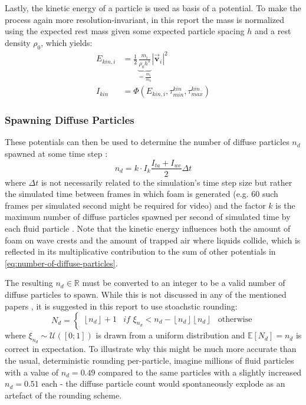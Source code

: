 \documentclass[oneside, a4paper]{book}
\newcommand\abs[1]{\left|#1\right|}
\newcommand\vek[1]{\vec{\bm{#1}}}
\newcommand\br[1]{\left(#1\right)}
\begin{document}
  Lastly, the kinetic energy of a particle is used as basis of a potential. To make the process again more resolution-invariant, in this report the mass is normalized using the expected rest mass given some expected particle spacing $h$ and a rest density $\rho_0$, which yields:
  \begin{align}
    E_{kin,i} &= \frac{1}{2} \underbrace{\frac{m_i}{\rho_0 h^3}}_{=\frac{m_i}{m_0}} \abs{\vek{v}_i}^2\\
    I_{kin} &= \Phi(E_{kin,i},\tau_{min}^{kin}, \tau_{max}^{kin})
  \end{align}

  \subsubsection{Spawning Diffuse Particles}
  These potentials can then be used to determine the number of diffuse particles $n_d$ spawned at some time step \autocite{turbulent-micropolar-foam}:
  \begin{equation}\label{eq:number-of-diffuse-particles}
    n_d = k \cdot I_k \frac{I_{ta}+I_{wc}}{2} \Delta t
  \end{equation}
  where $\Delta t$ is not necessarily related to the simulation's time step size but rather the simulated time between frames in which foam is generated (e.g. $60$ such frames per simulated second might be required for video) and the factor $k$ is the maximum number of diffuse particles spawned per second of simulated time by each fluid particle \autocite{turbulent-micropolar-foam}. Note that the kinetic energy influences both the amount of foam on wave crests and the amount of trapped air where liquids collide, which is reflected in its multiplicative contribution to the sum of other potentials in \autoref{eq:number-of-diffuse-particles}.

  The resulting $n_d\in\mathds{R}$ must be converted to an integer to be a valid number of diffuse particles to spawn. While this is not discussed in any of the mentioned papers \autocites{spray-foam-bubbles}{turbulent-micropolar-foam}, it is suggested in this report to use stoachstic rounding:
  \begin{equation}\label{eq:foam-stochastic-rounding-nd}
    N_d = \begin{cases}
      \left\lfloor n_d\right\rfloor + 1 & \textit{if } \xi_{n_d} < n_d - \left\lfloor n_d\right\rfloor 
      \left\lfloor n_d\right\rfloor & \text{otherwise}
    \end{cases}
  \end{equation}
  where $\xi_{n_d}\sim\mathcal{U}\br{[0;1]}$ is drawn from a uniform distribution and $\mathds{E}\left[N_d\right]=n_d$ is correct in expectation. To illustrate why this might be much more accurate than the usual, deterministic rounding per-particle, imagine millions of fluid particles with a value of $n_d=0.49$ compared to the same particles with a slightly increased $n_d=0.51$ each - the diffuse particle count would spontaneously explode as an artefact of the rounding scheme.
\end{document}
